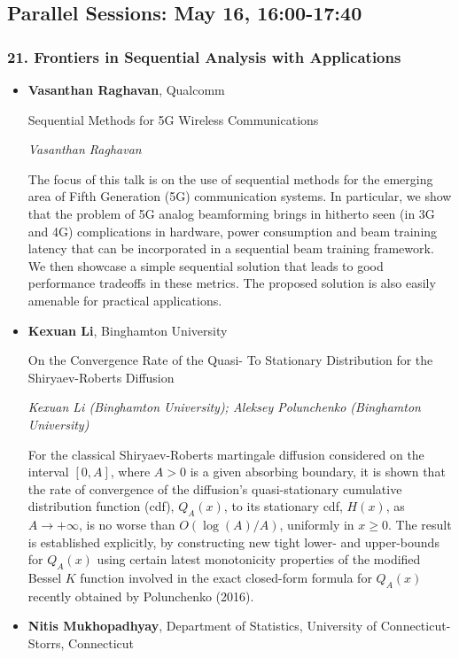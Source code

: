 \subsection*{Parallel Sessions: May 16, 16:00-17:40}

\subsubsection*{21. Frontiers in Sequential Analysis with Applications}

\begin{itemize}
\item \textbf{Vasanthan Raghavan}, Qualcomm

Sequential Methods for 5G Wireless Communications

\emph{\footnotesize Vasanthan Raghavan}

The focus of this talk is on the use of sequential methods for the emerging area of Fifth Generation (5G) communication systems. In particular, we show that the problem of 5G analog beamforming brings in hitherto seen (in 3G and 4G) complications in hardware, power consumption and beam training latency that can be incorporated in a sequential beam training framework. We then showcase a simple sequential solution that leads to good performance tradeoffs in these metrics. The proposed solution is also easily amenable for practical applications.

\item \textbf{Kexuan Li}, Binghamton University

On the Convergence Rate of the Quasi- To Stationary Distribution for the Shiryaev-Roberts Diffusion

\emph{\footnotesize Kexuan Li (Binghamton University); Aleksey Polunchenko (Binghamton University)}

For the classical Shiryaev-Roberts martingale diffusion considered on the interval $[0,A]$, where $A>0$ is a given absorbing boundary, it is shown that the rate of convergence of the diffusion's quasi-stationary cumulative distribution function (cdf), $Q_{A}(x)$, to its stationary cdf, $H(x)$, as $A\to+\infty$, is no worse than $O(\log(A)/A)$, uniformly in $x\ge0$. The result is established explicitly, by constructing new tight lower- and upper-bounds for $Q_{A}(x)$ using certain latest monotonicity properties of the modified Bessel $K$ function involved in the exact closed-form formula for $Q_{A}(x)$ recently obtained by Polunchenko (2016).

\item \textbf{Nitis Mukhopadhyay}, Department of Statistics, University of Connecticut-Storrs, Connecticut


\end{itemize}
